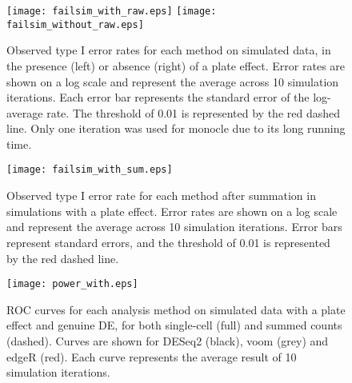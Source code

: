 \documentclass[oupdraft]{bio}
\begin{document}



\begin{figure}[!p]
\begin{center}
\texttt{[image: failsim\_with\_raw.eps]}
\texttt{[image: failsim\_without\_raw.eps]}
\end{center}
\caption{
    Observed type I error rates for each method on simulated data, in the presence (left) or absence (right) of a plate effect.
    Error rates are shown on a log scale and represent the average across 10 simulation iterations.
    Each error bar represents the standard error of the log-average rate.
    The threshold of 0.01 is represented by the red dashed line.
    Only one iteration was used for monocle due to its long running time.
}
\label{fig:platefail}
\end{figure}

\begin{figure}[!p]
\begin{center}
\texttt{[image: failsim\_with\_sum.eps]}
\end{center}
\caption{
    Observed type I error rate for each method after summation in simulations with a plate effect.
    Error rates are shown on a log scale and represent the average across 10 simulation iterations.
    Error bars represent standard errors, and the threshold of 0.01 is represented by the red dashed line.
}
\label{fig:platesum}
\end{figure}

\begin{figure}[!p]
\begin{center}
\texttt{[image: power\_with.eps]}
\end{center}
\caption{
    ROC curves for each analysis method on simulated data with a plate effect and genuine DE, for both single-cell (full) and summed counts (dashed).
    Curves are shown for DESeq2 (black), voom (grey) and edgeR (red).
    Each curve represents the average result of 10 simulation iterations.
}
\label{fig:roc}
\end{figure}
\end{document}
